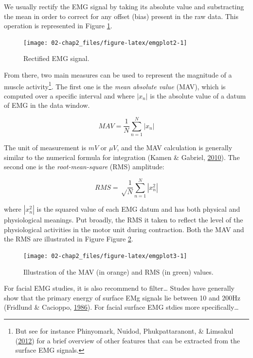 \documentclass[a4paper,12pt,twoside,openright,oldfontcommands]{memoir}
\let\rmarkdownfootnote\footnote%
\def\footnote{\protect\rmarkdownfootnote}
\begin{document}
We usually rectify the EMG signal by taking its absolute value and
substracting the mean in order to correct for any offset (bias) present
in the raw data. This operation is represented in Figure
\ref{fig:emgplot2}.

\begin{figure}[H]

{\centering \texttt{[image: 02-chap2\_files/figure-latex/emgplot2-1]} 

}

\caption{Rectified EMG signal.}\label{fig:emgplot2}
\end{figure}

From there, two main measures can be used to represent the magnitude of
a muscle activity\footnote{But see for instance Phinyomark, Nuidod,
  Phukpattaranont, \& Limsakul
  (\protect\hyperlink{ref-phinyomark_feature_2012}{2012}) for a brief
  overview of other features that can be extracted from the surface EMG
  signals.}. The first one is the \emph{mean absolute value} (MAV),
which is computed over a specific interval and where \(|x_{n}|\) is the
absolute value of a datum of EMG in the data window.

\[MAV = \frac{1}{N} \sum_{n=1}^{N} | x_{n} |\]

The unit of measurement is \(mV\) or \(\mu V\), and the MAV calculation
is generally similar to the numerical formula for integration (Kamen \&
Gabriel, \protect\hyperlink{ref-kamen_essentials_2010}{2010}). The
second one is the \emph{root-mean-square} (RMS) amplitude:

\[RMS = \sqrt \frac{1}{N} \sum_{n=1}^{N} | x^{2}_{n} |\]

where \(| x^{2}_{n} |\) is the squared value of each EMG datum and has
both physical and physiological meanings. Put broadly, the RMS it taken
to reflect the level of the physiological activities in the motor unit
during contraction. Both the MAV and the RMS are illustrated in Figure
Figure \ref{fig:emgplot3}.

\begin{figure}[H]

{\centering \texttt{[image: 02-chap2\_files/figure-latex/emgplot3-1]} 

}

\caption{Illustration of the MAV (in orange) and RMS (in green) values.}\label{fig:emgplot3}
\end{figure}

For facial EMG studies, it is also recommend to filter\ldots{} Studes
have generally show that the primary energy of surface EMg signals lie
between 10 and 200Hz (Fridlund \& Cacioppo,
\protect\hyperlink{ref-fridlund_guidelines_1986}{1986}). For facial
surface EMG stdies more specifically\ldots{}
\end{document}
